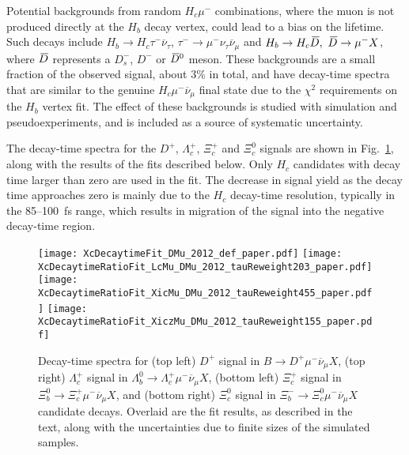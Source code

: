 \documentclass[12pt,a4paper]{article}
\def\Pmu         {\ensuremath{\upmu}\xspace}
\def\Pnu         {\ensuremath{\upnu}\xspace}
\def\Ptau        {\ensuremath{\uptau}\xspace}
\def\PXi         {\ensuremath{\Xi}\xspace}
\def\PLambda     {\ensuremath{\Lambda}\xspace}
\def\PD      {\ensuremath{\mathrm{D}}\xspace}
\def\Pb      {\ensuremath{\mathrm{b}}\xspace}
\def\Pc      {\ensuremath{\mathrm{c}}\xspace}
\def\Ps      {\ensuremath{\mathrm{s}}\xspace}
\def\thebaroffset{0.0em}
\def\Pmu         {\ensuremath{\mu}\xspace}
\def\Pnu         {\ensuremath{\nu}\xspace}
\def\Ptau        {\ensuremath{\tau}\xspace}
\def\PD      {\ensuremath{D}\xspace}
\def\Pb      {\ensuremath{b}\xspace}
\def\Pc      {\ensuremath{c}\xspace}
\def\Ps      {\ensuremath{s}\xspace}
\def\thebaroffset{0.18em}
\newcommand{\offsetoverline}[2][\thebaroffset]{\kern #1\overline{\kern -#1 #2}}
\def\mun        {{\ensuremath{\Pmu^-}}\xspace} \def\mupm       {{\ensuremath{\Pmu^\pm}}\xspace}
\def\taum       {{\ensuremath{\Ptau^-}}\xspace}
\def\neu        {{\ensuremath{\Pnu}}\xspace}
\def\neub       {{\ensuremath{\overline{\Pnu}}}\xspace}
\def\neumb      {{\ensuremath{\neub_\mu}}\xspace}
\def\neut       {{\ensuremath{\neu_\tau}}\xspace}
\def\neutb      {{\ensuremath{\neub_\tau}}\xspace}
\def\squark    {{\ensuremath{\Ps}}\xspace}
\def\cquark    {{\ensuremath{\Pc}}\xspace}
\def\bquark    {{\ensuremath{\Pb}}\xspace}
\def\Dbar    {{\ensuremath{\offsetoverline{\PD}}}\xspace}
\def\D       {{\ensuremath{\PD}}\xspace}
\def\Dzb     {{\ensuremath{\Dbar{}^0}}\xspace}
\def\Dp      {{\ensuremath{\D^+}}\xspace}
\def\Dm      {{\ensuremath{\D^-}}\xspace}
\def\Dsm     {{\ensuremath{\D^-_\squark}}\xspace}
\def\Lz          {{\ensuremath{\PLambda}}\xspace}
\def\Xires       {{\ensuremath{\PXi}}\xspace}
\def\Lc          {{\ensuremath{\Lz^+_\cquark}}\xspace}
\def\Xicz        {{\ensuremath{\Xires^0_\cquark}}\xspace}
\def\Xicp        {{\ensuremath{\Xires^+_\cquark}}\xspace}
\def\Lb           {{\ensuremath{\Lz^0_\bquark}}\xspace}
\def\Xibz         {{\ensuremath{\Xires^0_\bquark}}\xspace}
\def\Xibm         {{\ensuremath{\Xires^-_\bquark}}\xspace}
\def\to                 {\ensuremath{\rightarrow}\xspace}
\newcommand{\chisq}{\ensuremath{\chi^2}\xspace}
\begin{document}
Potential backgrounds from random $H_c\mun$ combinations, where the muon is not produced directly at the $H_b$ decay vertex, 
could lead to a bias on the lifetime. Such decays include $H_b\to H_c\taum\neutb$, \mbox{$\taum\to\mun\neut\neumb$} and 
$H_b\to H_c\Dbar,~\Dbar\to\mun X$, where $\Dbar$ represents a $\Dsm$, $\Dm$ or $\Dzb$ meson.
These backgrounds are a small fraction of the observed signal, 
about 3\% in total, and have decay-time spectra that are similar to the genuine $H_c\mun\neumb$ final state due to the 
$\chisq$ requirements on the $H_b$ vertex fit. The effect of these backgrounds is studied with simulation
and pseudoexperiments, and is included as a source of systematic uncertainty. 

The decay-time spectra for the $\Dp$, $\Lc$, $\Xicp$ and $\Xicz$ signals are shown in Fig.~\ref{fig:XcDecaytimeRatioFits}, along 
with the results of the fits described below. Only $H_c$ candidates with decay time larger than zero are used in the fit.
The decrease in signal yield as the decay time approaches zero is mainly due to 
the $H_c$ decay-time resolution, typically in the 85--100~fs range, which results in migration of the signal into the negative 
decay-time region.

\begin{figure}[tb]
\centering
\texttt{[image: XcDecaytimeFit\_DMu\_2012\_def\_paper.pdf]}
\texttt{[image: XcDecaytimeRatioFit\_LcMu\_DMu\_2012\_tauReweight203\_paper.pdf]}
\texttt{[image: XcDecaytimeRatioFit\_XicMu\_DMu\_2012\_tauReweight455\_paper.pdf]}
\texttt{[image: XcDecaytimeRatioFit\_XiczMu\_DMu\_2012\_tauReweight155\_paper.pdf]}
\caption{\small{Decay-time spectra for (top left) $\Dp$ signal in $B\to\Dp\mun\neumb X$, (top right) $\Lc$ signal in
$\Lb\to\Lc\mun\neumb X$, (bottom left) $\Xicp$ signal in $\Xibz\to\Xicp\mun\neumb X$, and 
(bottom right) $\Xicz$ signal in $\Xibm\to\Xicz\mun\neumb X$ candidate decays.
Overlaid are the fit results, as described in the text, along with the uncertainties due to finite sizes of the simulated samples.}}
\label{fig:XcDecaytimeRatioFits}
\end{figure}
\end{document}
